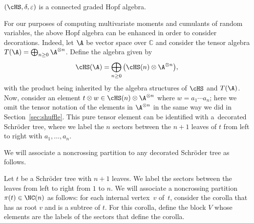 \begin{Proposition}
$(\cHS,\delta,\varepsilon)$ is a connected graded Hopf algebra.
\end{Proposition}

For our purposes of computing multivariate moments and cumulants of random variables, the above Hopf algebra can be enhanced in order to consider decorations. Indeed, let $\A$ be vector space over $\mathbb{C}$ and consider the tensor algebra $T(\A) = \bigoplus_{n\geq0} \A^{\otimes n}$. Define the algebra given by
\[
	\cHS(\A) = \bigoplus_{n\geq0} \big(\cHS(n) \otimes \A^{\otimes n}\big),
\]
with the product being inherited by the algebra structures of $\cHS$ and $T(\A)$. Now, consider an element $t\otimes w\in \cHS(n) \otimes \A^{\otimes n}$ where $w = a_1\cdots a_n$; here we omit the tensor notation of the elements in $\A^{\otimes n}$ in the same way we did in Section~\ref{sec:shuffle}. This pure tensor element can be identified with a~decorated Schr\"oder tree, where we label the $n$ sectors between the $n+1$ leaves of $t$ from left to right with $a_1,\dots, a_n$.

We will associate a noncrossing partition to any decorated Schr\"oder tree as follows.

\begin{Definition}\label{def:pit}
Let $t$ be a Schr\"oder tree with $n+1$ leaves. We label the sectors between the leaves from left to right from $1$ to $n$. We will associate a noncrossing partition $\pi(t) \in \NC(n)$ as follows: for each internal vertex~$v$ of~$t$, consider the corolla that has as root $v$ and is a subtree of $t$. For this corolla, define the block $V$ whose elements are the labels of the sectors that define the corolla.
\end{Definition}

